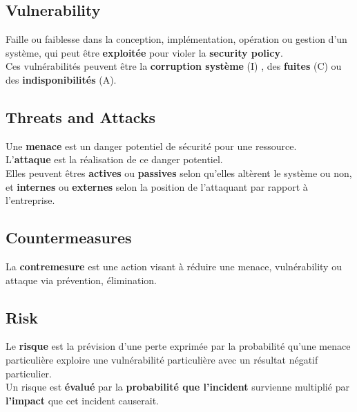 \documentclass{report}
\begin{document}
		\subsection{Vulnerability}

			Faille ou faiblesse dans la conception, implémentation, opération ou gestion d'un système, qui peut être \textbf{exploitée} pour violer la \textbf{security policy}.\\

			Ces vulnérabilités peuvent être la \textbf{corruption système} (I) , des \textbf{fuites} (C) ou des \textbf{indisponibilités} (A).\\

		\subsection{Threats and Attacks}

			Une \textbf{menace} est un danger potentiel de sécurité pour une ressource.\\

			L'\textbf{attaque} est la réalisation de ce danger potentiel.\\
			Elles peuvent êtres \textbf{actives} ou \textbf{passives} selon qu'elles altèrent le système ou non, et \textbf{internes} ou \textbf{externes} selon la position de l'attaquant par rapport à l'entreprise.\\

		\subsection{Countermeasures}

			La \textbf{contremesure} est une action visant à réduire une menace, vulnérability ou attaque via prévention, élimination.\\

		\subsection{Risk}

			Le \textbf{risque} est la prévision d'une perte exprimée par la probabilité qu'une menace particulière exploire une vulnérabilité particulière avec un résultat négatif particulier.\\

			Un risque est \textbf{évalué} par la \textbf{probabilité que l'incident} survienne multiplié par \textbf{l'impact} que cet incident causerait.\\
\end{document}
